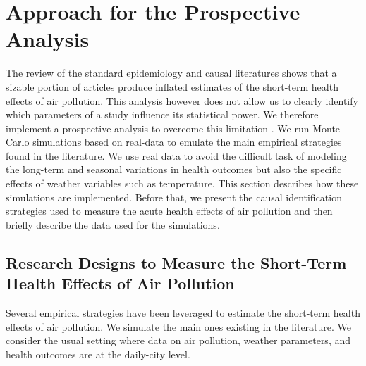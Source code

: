 \documentclass[12pt]{article}
\begin{document}



\section{Approach for the Prospective Analysis}\label{section_simulations}

        The review of the standard epidemiology and causal literatures shows that a sizable portion of articles produce inflated estimates of the short-term health effects of air pollution. This analysis however does not allow us to clearly identify which parameters of a study influence its statistical power. We therefore implement a prospective analysis to overcome this limitation \citep[for other examples of power simulations]{altoe_enhancing_2020, black_simulated_2022}. We run Monte-Carlo simulations based on real-data to emulate the main empirical strategies found in the literature. We use real data to avoid the difficult task of modeling the long-term and seasonal variations in health outcomes but also the specific effects of weather variables such as temperature. This section describes how these simulations are implemented. Before that, we present the causal identification strategies used to measure the acute health effects of air pollution and then briefly describe the data used for the simulations.
        
    \subsection{Research Designs to Measure the Short-Term Health Effects of Air Pollution}
        
        Several empirical strategies have been leveraged to estimate the short-term health effects of air pollution. We simulate the main ones existing in the literature. We consider the usual setting where data on air pollution, weather parameters, and health outcomes are at the daily-city level.
        
\end{document}
